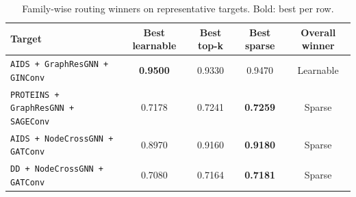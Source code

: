 \begin{table}[t]
\centering
\small
\caption{Family-wise routing winners on representative targets. Bold: best per row.}
\label{tab:residual_routing_family_detail}
\begin{tabular}{lcccc}
\toprule
Target & Best learnable & Best top-k & Best sparse & Overall winner \\
\midrule
\texttt{AIDS + GraphResGNN + GINConv} & \textbf{0.9500} & 0.9330 & 0.9470 & Learnable \\
\texttt{PROTEINS + GraphResGNN + SAGEConv} & 0.7178 & 0.7241 & \textbf{0.7259} & Sparse \\
\texttt{AIDS + NodeCrossGNN + GATConv} & 0.8970 & 0.9160 & \textbf{0.9180} & Sparse \\
\texttt{DD + NodeCrossGNN + GATConv} & 0.7080 & 0.7164 & \textbf{0.7181} & Sparse \\
\bottomrule
\end{tabular}
\end{table}
